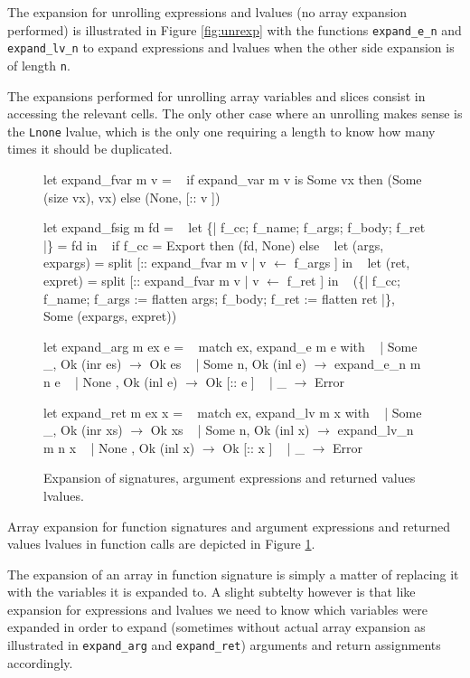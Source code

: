 \documentclass{article}
\begin{document}
The expansion for unrolling expressions and lvalues (no array expansion
performed) is illustrated in Figure \ref{fig:unrexp} with the functions
\texttt{expand\_e\_n} and \texttt{expand\_lv\_n} to expand expressions and
lvalues when the other side expansion is of length \texttt{n}.

The expansions performed for unrolling array variables and slices consist in
accessing the relevant cells. The only other case where an unrolling makes sense
is the \texttt{Lnone} lvalue, which is the only one requiring a length to know
how many times it should be duplicated.

\medskip

\begin{figure}[t]
\obeylines\obeyspaces\ttfamily%
let expand\_fvar m v =
~ if expand\_var m v is Some vx then (Some (size vx), vx) else (None, [:: v ])

let expand\_fsig m fd =
~ let \{| f\_cc; f\_name; f\_args; f\_body; f\_ret |\} = fd in
~ if f\_cc = Export then (fd, None) else
~ let (args, expargs) = split [:: expand\_fvar m v | v \(\leftarrow\) f\_args ] in
~ let (ret,  expret)  = split [:: expand\_fvar m v | v \(\leftarrow\) f\_ret  ] in
~ (\{| f\_cc; f\_name; f\_args := flatten args; f\_body; f\_ret := flatten ret |\},
~   Some (expargs, expret))

let expand\_arg m ex e =
~ match ex, expand\_e m e with
~ | Some \_, Ok (inr es)  \(\rightarrow\) Ok es
~ | Some n, Ok (inl e)   \(\rightarrow\) expand\_e\_n m n e
~ | None  , Ok (inl e)   \(\rightarrow\) Ok [:: e ]
~ | \_                    \(\rightarrow\) Error

let expand\_ret m ex x =
~ match ex, expand\_lv m x with
~ | Some \_, Ok (inr xs)   \(\rightarrow\) Ok xs
~ | Some n, Ok (inl x)    \(\rightarrow\) expand\_lv\_n m n x
~ | None  , Ok (inl x)    \(\rightarrow\) Ok [:: x ]
~ | \_                     \(\rightarrow\) Error
\normalfont%
\caption{Expansion of signatures, argument expressions and returned values lvalues.}\label{fig:sigexp}
\end{figure}

Array expansion for function signatures and argument expressions and
returned values lvalues in function calls are depicted in Figure
\ref{fig:sigexp}.

The expansion of an array in function signature is simply a matter of replacing
it with the variables it is expanded to. A slight subtelty however is that like
expansion for expressions and lvalues we need to know which variables were
expanded in order to expand (sometimes without actual array expansion as
illustrated in \texttt{expand\_arg} and \texttt{expand\_ret}) arguments and
return assignments accordingly.
\end{document}
